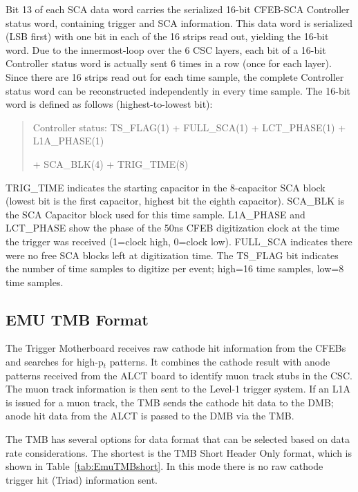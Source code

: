 Bit 13 of each SCA data word carries the serialized 16-bit CFEB-SCA
Controller status word, containing trigger and SCA information.
This data word is serialized (LSB first) with one bit in each of
the 16 strips read out, yielding the 16-bit word.  Due to the
innermost-loop over the 6 CSC layers, each bit of a 16-bit
Controller status word is actually sent 6 times in a
row (once for each layer).  Since there are 16 strips read out
for each time sample, the complete Controller status word can be
reconstructed independently in every time sample.  The 16-bit word
is defined as follows (highest-to-lowest bit):
\begin{quotation}
Controller status:  TS\_FLAG(1) + FULL\_SCA(1) + LCT\_PHASE(1) 
+ L1A\_PHASE(1)

\hspace{.6in} + SCA\_BLK(4) + TRIG\_TIME(8)
\end{quotation}
TRIG\_TIME indicates 
the starting capacitor in the 8-capacitor SCA block
(lowest bit is the first capacitor, highest bit the eighth capacitor).
SCA\_BLK is the SCA Capacitor block used
for this time sample. L1A\_PHASE and LCT\_PHASE show the phase
of the 50ns CFEB digitization clock at the time the trigger
was received (1=clock high, 0=clock low).  FULL\_SCA indicates
there were no free SCA blocks left at digitization time.
The TS\_FLAG bit indicates the number of time samples to digitize
per event; high=16 time samples, low=8 time samples.

\subsection{EMU TMB Format}

The Trigger Motherboard receives raw cathode hit information from the
CFEBs and searches for high-p$_t$ patterns.  It combines the cathode
result with anode patterns received from the ALCT board to identify
muon track stubs in the CSC.  The muon track information is then sent
to the Level-1 trigger system.  If an L1A is issued for a muon track,
the TMB sends the cathode hit data to the DMB; %
anode hit data from the ALCT is passed to the DMB via the TMB.

The TMB has several options for data format that can be
selected based on data rate considerations.  The shortest is the
TMB Short Header Only format, which is shown in Table~\ref{tab:EmuTMBshort}.
In this mode there is no raw cathode trigger hit (Triad) information sent.

